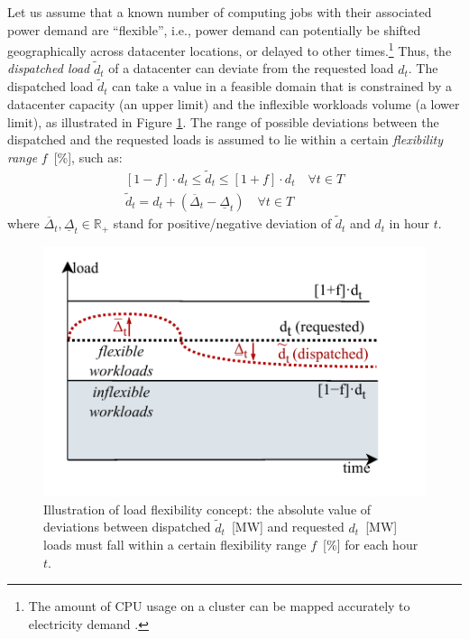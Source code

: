Let us assume that a known number of computing jobs with their associated power demand are \enquote{flexible}, i.e., power demand can potentially be shifted geographically across datacenter locations, or delayed to other times.\footnote{The amount of CPU usage on a cluster can be mapped accurately to electricity demand \cite{radovanovicIEEE2023}.} Thus, the \textit{dispatched load} $\widetilde{d}_t$ of a datacenter can deviate from the requested load $d_t$. The dispatched load $\widetilde{d}_t$ can take a value in a feasible domain that is constrained by a datacenter capacity (an upper limit) and the inflexible workloads volume (a lower limit), as illustrated in Figure \ref{fig:workloads}. The range of possible deviations between the dispatched and the requested loads is assumed to lie within a certain \textit{flexibility range} $f$~[\%], such as:
\begin{subequations}
  \begin{align}
    [1-f] \cdot d_t \le  \widetilde{d}_t  \le [1+f] \cdot d_t \quad \forall t \in T
    \label{eqn:dcaps} \\
    \widetilde{d}_t = d_t + (\overline{\Delta}_t - \underline{\Delta}_t) \quad \forall t \in T
    \label{eqn:dtilde}
  \end{align}
  \label{eqn:range}
\end{subequations}
\noindent where $\overline{\Delta}_t, \underline{\Delta}_t \in \mathbb{R}_{+}$ stand for positive/negative deviation of $\widetilde{d}_t$ and $d_t$ in hour $t$.

\begin{figure}
    \centering
    \includegraphics[width=1\columnwidth]{img/flexibility.pdf}
    \caption{Illustration of load flexibility concept: the absolute value of deviations between dispatched $\widetilde{d}_t$~[MW] and requested $d_t$~[MW] loads must fall within a certain flexibility range $f$~[\%] for each hour $t$.}
    \label{fig:workloads}
\end{figure}

